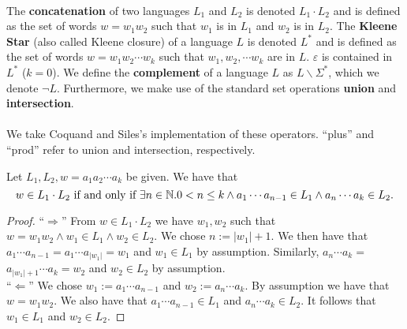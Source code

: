     \paragraph{}

    The \textbf{concatenation} of two languages $L_1$ and $L_2$ is denoted $L_1 \cdot L_2$ and is defined as the set of words $w = w_1 w_2$ such that $w_1$ is in $L_1$ and $w_2$ is in $L_2$.
    The \textbf{Kleene Star} (also called Kleene closure) of a language $L$ is denoted $L^*$ and is defined as the set of words $w = w_1 w_2 \cdots w_k$ such that $w_1, w_2, \cdots w_k$ are in $L$. $\varepsilon$ is contained in $L^*$ ($k=0$).
    We define the \textbf{complement} of a language $L$ as $L \backslash \Sigma^*$, which we denote $\neg L$.
    Furthermore, we make use of the standard set operations \textbf{union} and \textbf{intersection}.

    \paragraph{}
    We take Coquand and Siles's \cite{DBLP:conf/cpp/CoquandS11} implementation of these operators. ``plus'' and ``prod'' refer to union and intersection, respectively.



    \begin{lemma}
        \label{concP}
        Let $L_1, L_2, w = a_1 a_2 \cdots a_k$ be given. We have that
        \begin{equation*}
            w \in L_1 \cdot L_2  \\
            \mbox{ if and only if }  \\
            \exists n \in \mathbb{N}. 0 < n \le k \wedge a_1 \cdots a_{n-1} \in L_1 \wedge a_n \cdots a_k \in L_2.
        \end{equation*}
    \end{lemma}
    \begin{proof}
        ``$\Rightarrow$'' 
        From $w \in L_1 \cdot L_2$ we have $w_1, w_2$ such that $w = w_1 w_2 \wedge w_1 \in L_1 \wedge w_2 \in L_2$.
        We chose $n := |w_1|+1$. We then have that $a_1 \cdots a_{n-1} = a_1 \cdots a_{|w_1|} = w_1$ and $w_1 \in L_1$ by assumption.
        Similarly, $a_{n} \cdots a_k = $$ a_{|w_1| + 1} \cdots a_k = w_2$ and $w_2 \in L_2$ by assumption.
        \\
        ``$\Leftarrow$'' 
        We chose $w_1 := a_1 \cdots a_{n-1}$ and $w_2 := a_n \cdots a_k$. By assumption we have that $w = w_1 w_2$.
        We also have that $a_1 \cdots a_{n-1} \in L_1$ and $a_{n} \cdots a_k \in L_2$. 
        It follows that $w_1 \in L_1$ and $w_2 \in L_2$.
    \end{proof}
    

